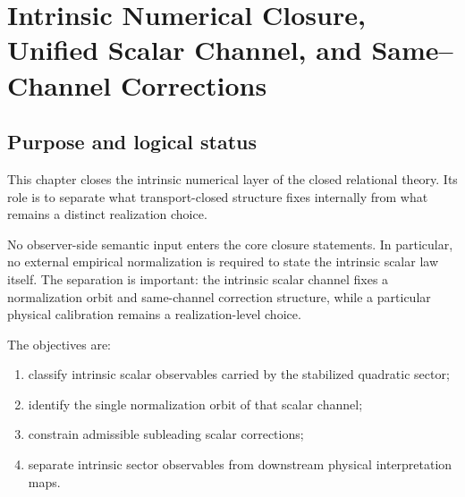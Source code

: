 \chapter{Intrinsic Numerical Closure, Unified Scalar Channel, and Same--Channel Corrections}
\label{ch:numerical-closure}
\label{ch:numbers-shell-closure}

\begin{chapterorientation}
\end{chapterorientation}
\section{Purpose and logical status}
\label{sec:shell-purpose}

This chapter closes the intrinsic numerical layer of the closed relational
theory.
Its role is to separate what transport-closed structure fixes internally
from what remains a distinct realization choice.

No observer-side semantic input enters the core closure statements.
In particular, no external empirical normalization is required to state the
intrinsic scalar law itself.
The separation is important: the intrinsic scalar channel fixes a
normalization orbit and same-channel correction structure, while a
particular physical calibration remains a realization-level choice.

The objectives are:
\begin{enumerate}[label=\textup{(\roman*)}]
\item classify intrinsic scalar observables carried by the stabilized
      quadratic sector;
\item identify the single normalization orbit of that scalar channel;
\item constrain admissible subleading scalar corrections;
\item separate intrinsic sector observables from downstream physical
      interpretation maps.
\end{enumerate}

